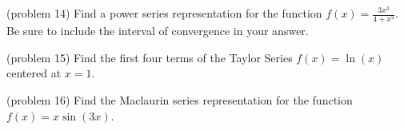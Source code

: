 \documentclass[handout]{ximera}
\begin{document}
\begin{problem}(problem 14)
Find a power series representation for the function $\displaystyle f(x) = \frac{3x^3}{4 + x^2}$.
Be sure to include the interval of convergence in your answer.

\end{problem}



\begin{problem}(problem 15)
Find the first four terms of the Taylor Series $f(x) = \ln(x)$ centered at $x = 1$.

\end{problem}



\begin{problem}(problem 16)
Find the Maclaurin series representation for the function $f(x) = x\sin(3x)$.

\end{problem}
\end{document}
